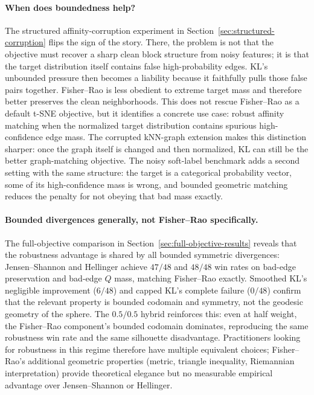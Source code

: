 \documentclass[11pt]{article}
\begin{document}
\paragraph{When does boundedness help?}
The structured affinity-corruption experiment in Section~\ref{sec:structured-corruption}
flips the sign of the story. There, the problem is not that the objective must recover a sharp
clean block structure from noisy features; it is that the target distribution itself contains
false high-probability edges. KL's unbounded pressure then becomes a liability because it
faithfully pulls those false pairs together. Fisher--Rao is less obedient to extreme target
mass and therefore better preserves the clean neighborhoods. This does not rescue
Fisher--Rao as a default t-SNE objective, but it identifies a concrete use case: robust
affinity matching when the normalized target distribution contains spurious high-confidence
edge mass. The corrupted kNN-graph extension makes this distinction sharper: once the graph
itself is changed and then normalized, KL can still be the better graph-matching objective.
The noisy soft-label benchmark adds a second setting with the same structure: the target is a
categorical probability vector, some of its high-confidence mass is wrong, and bounded
geometric matching reduces the penalty for not obeying that bad mass exactly.

\paragraph{Bounded divergences generally, not Fisher--Rao specifically.}
The full-objective comparison in Section~\ref{sec:full-objective-results} reveals that the
robustness advantage is shared by all bounded symmetric divergences: Jensen--Shannon and
Hellinger achieve $47/48$ and $48/48$ win rates on bad-edge preservation and bad-edge $Q$
mass, matching Fisher--Rao exactly. Smoothed KL's negligible improvement ($6/48$) and capped
KL's complete failure ($0/48$) confirm that the relevant property is bounded codomain and
symmetry, not the geodesic geometry of the sphere. The $0.5/0.5$ hybrid reinforces this:
even at half weight, the Fisher--Rao component's bounded codomain dominates, reproducing the
same robustness win rate and the same silhouette disadvantage. Practitioners looking for
robustness in this regime therefore have multiple equivalent choices; Fisher--Rao's additional
geometric properties (metric, triangle inequality, Riemannian interpretation) provide
theoretical elegance but no measurable empirical advantage over Jensen--Shannon or Hellinger.
\end{document}
